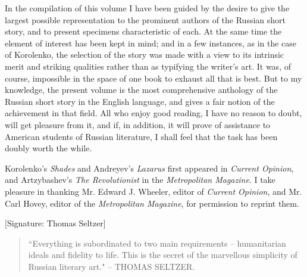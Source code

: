 In the compilation of this volume I have been guided by the desire to
give the largest possible representation to the prominent authors of
the Russian short story, and to present specimens characteristic of
each. At the same time the element of interest has been kept in mind;
and in a few instances, as in the case of Korolenko, the selection of
the story was made with a view to its intrinsic merit and striking
qualities rather than as typifying the writer's art. It was, of
course, impossible in the space of one book to exhaust all that is
best. But to my knowledge, the present volume is the most
comprehensive anthology of the Russian short story in the English
language, and gives a fair notion of the achievement in that field.
All who enjoy good reading, I have no reason to doubt, will get
pleasure from it, and if, in addition, it will prove of assistance to
American students of Russian literature, I shall feel that the task
has been doubly worth the while.

Korolenko's \emph{Shades} and Andreyev's \emph{Lazarus} first appeared in
\emph{Current Opinion}, and Artzybashev's \emph{The Revolutionist} in the
\emph{Metropolitan Magazine}. I take pleasure in thanking Mr. Edward J.
Wheeler, editor of \emph{Current Opinion}, and Mr. Carl Hovey, editor of
the \emph{Metropolitan Magazine}, for permission to reprint them.

\medskip

\begin{center}
[Signature: Thomas Seltzer]
\end{center}

\medskip

\begin{quote}
    ``Everything is subordinated to two main requirements -- humanitarian
ideals and fidelity to life. This is the secret of the marvellous
simplicity of Russian literary art." -- THOMAS SELTZER.
\end{quote}
